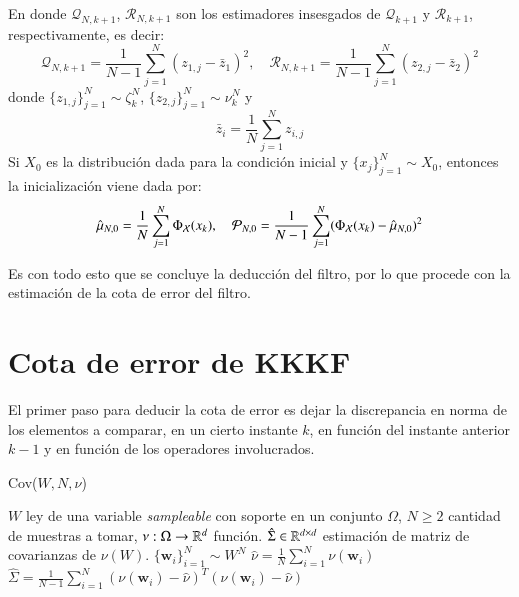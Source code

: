 En donde $\mathcal{Q}_{N,k+1}$, $\mathcal{R}_{N,k+1}$ son los estimadores insesgados de $\mathcal{Q}_{k+1}$ y $\mathcal{R}_{k+1}$, respectivamente, es decir:
\begin{equation}
	\mathcal{Q}_{N,k+1} = \frac{1}{N-1}\sum_{j=1}^N (z_{1,j} - \bar{z}_1)^2, \quad \mathcal{R}_{N,k+1} = \frac{1}{N-1}\sum_{j=1}^N (z_{2,j} - \bar{z}_2)^2
	\label{eq: emp_covars}
\end{equation}
donde $\{ z_{1,j} \}_{j=1}^N \sim \zeta_k^N$, $\{ z_{2,j} \}_{j=1}^N \sim \nu_k^N$ y 
\begin{equation*}
	\bar{z}_i = \frac{1}{N} \sum_{j=1}^N z_{i,j}
\end{equation*}
Si $X_0$ es la distribución dada para la condición inicial y $\{ x_j \}_{j=1}^N \sim X_0$, entonces la inicialización viene dada por:
\begin{equation}
	\hat{\mu}_{N,0} = \frac{1}{N} \sum_{j=1}^N \Phi_{\mathcal{X}}(x_{k}), \quad \mathcal{P}_{N,0} = \frac{1}{N-1} \sum_{j=1}^N (\Phi_{\mathcal{X}}(x_{k}) - \hat{\mu}_{N,0})^2
	\label{eq: mean_element_covar}
\end{equation}

Es con todo esto que se concluye la deducción del filtro, por lo que procede con la estimación de la cota de error del filtro.

\section{Cota de error de KKKF}

El primer paso para deducir la cota de error es dejar la discrepancia en norma de los elementos a comparar, en un cierto instante $k$, en función del instante anterior $k-1$ y en función de los operadores involucrados.

\begin{algorithm}
\caption{Cov($W, N, \nu$)}\label{alg:AppCov}
\begin{algorithmic}[1]
\Require $W$ ley de una variable \textit{sampleable} con soporte en un conjunto $\Omega$, $N \geq 2$ cantidad de muestras a tomar, $\nu:\Omega \to \mathbb{R}^d$ función.
\Ensure $\hat{\Sigma} \in \mathbb{R}^{d \times d}$ estimación de matriz de covarianzas de $\nu(W)$.
\State $\{ \mathbf{w}_i \}_{i=1}^N \sim W^N$  
\State $\hat{\nu} = \frac{1}{N} \sum_{i=1}^N \nu (\mathbf{w}_i)$ 
\State $\hat{\Sigma} = \frac{1}{N-1} \sum_{i=1}^N (\nu (\mathbf{w}_i) - \hat{\nu})^T(\nu (\mathbf{w}_i) - \hat{\nu})$  
\end{algorithmic}
\end{algorithm}

